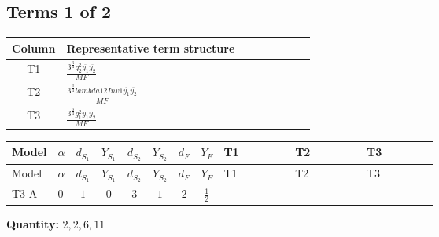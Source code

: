 \documentclass[8pt]{article}
\begin{document}
\begin{landscape}
\subsection*{Terms 1 of 2}
\begin{center}
\begin{tabular}{@{}c >{\raggedright\arraybackslash}p{0.82\linewidth}@{}}
\toprule
Column & Representative term structure \\
\midrule
T1 & \(\displaystyle \frac{3^{\frac{3}{4}} g_{2}^{2} \overline{y_{1}} \overline{y_{2}}}{MF}\) \\
\midrule
T2 & \(\displaystyle \frac{3^{\frac{3}{4}} lambda12Inv1 \overline{y_{1}} \overline{y_{2}}}{MF}\) \\
\midrule
T3 & \(\displaystyle \frac{3^{\frac{3}{4}} g_{1}^{2} \overline{y_{1}} \overline{y_{2}}}{MF}\) \\
\midrule
\bottomrule
\end{tabular}
\end{center}
\smallskip
\tiny
\begin{longtable}{@{}llcccccc >{\raggedright\arraybackslash}p{0.21\linewidth} >{\raggedright\arraybackslash}p{0.21\linewidth} >{\raggedright\arraybackslash}p{0.21\linewidth}@{}}
\toprule
Model & $\alpha$ & $d_{S_1}$ & $Y_{S_1}$ & $d_{S_2}$ & $Y_{S_2}$ & $d_F$ & $Y_F$ & T1 & T2 & T3 \\
\midrule
\endfirsthead
\toprule
Model & $\alpha$ & $d_{S_1}$ & $Y_{S_1}$ & $d_{S_2}$ & $Y_{S_2}$ & $d_F$ & $Y_F$ & T1 & T2 & T3 \\
\midrule
\endhead
T3-A & $0$ & $1$ & $0$ & $3$ & $1$ & $2$ & $\frac{1}{2}$ & \scriptsize\adjustbox{max width=\linewidth}{$\begin{gathered} - \frac{11 \cdot 3^{\frac{3}{4}} g_{2}^{2} \overline{y_{1}} \overline{y_{2}}}{8 MF}\end{gathered}$} & \scriptsize\adjustbox{max width=\linewidth}{$\begin{gathered} - \frac{3^{\frac{3}{4}} lambda12Inv1 \overline{y_{1}} \overline{y_{2}}}{6 MF}\end{gathered}$} & \scriptsize\adjustbox{max width=\linewidth}{$\begin{gathered} - \frac{3^{\frac{3}{4}} g_{1}^{2} \overline{y_{1}} \overline{y_{2}}}{8 MF}\end{gathered}$} \\
\midrule
\bottomrule
\end{longtable}
\clearpage
\noindent\textbf{Quantity: }$\mathrm{2,2,6,11}$\par\smallskip

\end{landscape}
\end{document}
